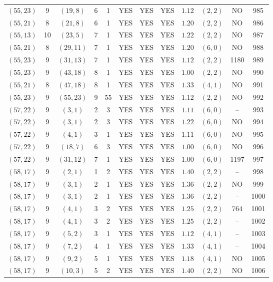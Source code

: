 \begin{longtable}{|c|c|c|c|c|c|c|c|c|c|c|c|}
$(55,23)$ & 9 & $(19,8)$ & 6 & 1 & YES & YES & YES & $1.12$ & $(2,2)$ & NO & 985\\
$(55,21)$ & 8 & $(21,8)$ & 6 & 1 & YES & YES & YES & $1.20$ & $(2,2)$ & NO & 986\\
$(55,13)$ & 10 & $(23,5)$ & 7 & 1 & YES & YES & YES & $1.22$ & $(2,2)$ & NO & 987\\
$(55,21)$ & 8 & $(29,11)$ & 7 & 1 & YES & YES & YES & $1.20$ & $(6,0)$ & NO & 988\\
$(55,23)$ & 9 & $(31,13)$ & 7 & 1 & YES & YES & YES & $1.12$ & $(2,2)$ & 1180 & 989\\
$(55,23)$ & 9 & $(43,18)$ & 8 & 1 & YES & YES & YES & $1.00$ & $(2,2)$ & NO & 990\\
$(55,21)$ & 8 & $(47,18)$ & 8 & 1 & YES & YES & YES & $1.33$ & $(4,1)$ & NO & 991\\
$(55,23)$ & 9 & $(55,23)$ & 9 & 55 & YES & YES & YES & $1.12$ & $(2,2)$ & NO & 992\\
$(57,22)$ & 9 & $(3,1)$ & 2 & 3 & YES & YES & YES & $1.11$ & $(6,0)$ & -- & 993\\
$(57,22)$ & 9 & $(3,1)$ & 2 & 3 & YES & YES & YES & $1.22$ & $(6,0)$ & NO & 994\\
$(57,22)$ & 9 & $(4,1)$ & 3 & 1 & YES & YES & YES & $1.11$ & $(6,0)$ & NO & 995\\
$(57,22)$ & 9 & $(18,7)$ & 6 & 3 & YES & YES & YES & $1.00$ & $(6,0)$ & NO & 996\\
$(57,22)$ & 9 & $(31,12)$ & 7 & 1 & YES & YES & YES & $1.00$ & $(6,0)$ & 1197 & 997\\
$(58,17)$ & 9 & $(2,1)$ & 1 & 2 & YES & YES & YES & $1.40$ & $(2,2)$ & -- & 998\\
$(58,17)$ & 9 & $(3,1)$ & 2 & 1 & YES & YES & YES & $1.36$ & $(2,2)$ & NO & 999\\
$(58,17)$ & 9 & $(3,1)$ & 2 & 1 & YES & YES & YES & $1.36$ & $(2,2)$ & -- & 1000\\
$(58,17)$ & 9 & $(4,1)$ & 3 & 2 & YES & YES & YES & $1.25$ & $(2,2)$ & 764 & 1001\\
$(58,17)$ & 9 & $(4,1)$ & 3 & 2 & YES & YES & YES & $1.25$ & $(2,2)$ & -- & 1002\\
$(58,17)$ & 9 & $(5,2)$ & 3 & 1 & YES & YES & YES & $1.12$ & $(4,1)$ & -- & 1003\\
$(58,17)$ & 9 & $(7,2)$ & 4 & 1 & YES & YES & YES & $1.33$ & $(4,1)$ & -- & 1004\\
$(58,17)$ & 9 & $(9,2)$ & 5 & 1 & YES & YES & YES & $1.18$ & $(4,1)$ & NO & 1005\\
$(58,17)$ & 9 & $(10,3)$ & 5 & 2 & YES & YES & YES & $1.40$ & $(2,2)$ & NO & 1006\\

\end{longtable}
